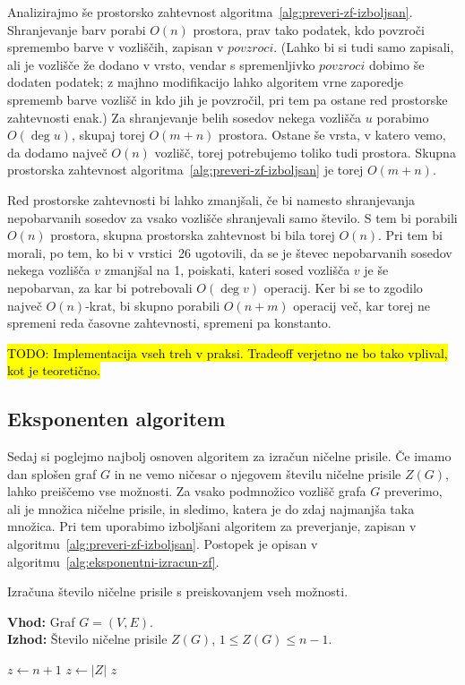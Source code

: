 \documentclass[12pt,a4paper,twoside]{article}
\theoremstyle{definition} %
\theoremstyle{plain} %
\numberwithin{equation}{section}  %
\begin{document}
Analizirajmo še prostorsko zahtevnost algoritma~\ref{alg:preveri-zf-izboljsan}. Shranjevanje barv porabi $O(n)$ prostora, prav tako podatek, kdo povzroči spremembo barve v vozliščih, zapisan v $povzroci$. (Lahko bi si tudi samo zapisali, ali je vozlišče že dodano v vrsto, vendar s spremenljivko $povzroci$ dobimo še dodaten podatek; z majhno modifikacijo lahko algoritem vrne zaporedje sprememb barve vozlišč in kdo jih je povzročil, pri tem pa ostane red prostorske zahtevnosti enak.) Za shranjevanje belih sosedov nekega vozlišča $u$ porabimo $O(\deg u)$, skupaj torej $O(m+n)$ prostora. Ostane še vrsta, v katero vemo, da dodamo največ $O(n)$ vozlišč, torej potrebujemo toliko tudi prostora. Skupna prostorska zahtevnost algoritma~\ref{alg:preveri-zf-izboljsan} je torej $O(m+n)$.

Red prostorske zahtevnosti bi lahko zmanjšali, če bi namesto shranjevanja nepobarvanih sosedov za vsako vozlišče shranjevali samo število. S tem bi porabili $O(n)$ prostora, skupna prostorska zahtevnost bi bila torej $O(n)$. Pri tem bi morali, po tem, ko bi v vrstici~26 ugotovili, da se je števec nepobarvanih sosedov nekega vozlišča $v$ zmanjšal na 1, poiskati, kateri sosed vozlišča $v$ je še nepobarvan, za kar bi potrebovali $O(\deg v)$ operacij. Ker bi se to zgodilo največ $O(n)$-krat, bi skupno porabili $O(n+m)$ operacij več, kar torej ne spremeni reda časovne zahtevnosti, spremeni pa konstanto.

\hl{TODO: Implementacija vseh treh v praksi. Tradeoff verjetno ne bo tako vplival, kot je teoretično.}

\subsection{Eksponenten algoritem}
Sedaj si poglejmo najbolj osnoven algoritem za izračun ničelne prisile. Če imamo dan splošen graf $G$ in ne vemo ničesar o njegovem številu ničelne prisile $Z(G)$, lahko preiščemo vse možnosti. Za vsako podmnožico vozlišč grafa $G$ preverimo, ali je množica ničelne prisile, in sledimo, katera je do zdaj najmanjša taka množica. Pri tem uporabimo izboljšani algoritem za preverjanje, zapisan v algoritmu~\ref{alg:preveri-zf-izboljsan}. Postopek je opisan v algoritmu~\ref{alg:eksponentni-izracun-zf}.
\begin{algorithm}[!h]
    \caption{Izračuna število ničelne prisile s preiskovanjem vseh možnosti.}
    \label{alg:eksponentni-izracun-zf}
    \raggedright
    \textbf{Vhod:} Graf $G = (V,E)$. \\
    \textbf{Izhod:} Število ničelne prisile $Z(G)$, $1 \leq Z(G) \leq n-1$.
    \begin{algorithmic}[1]
        \State $z \gets n+1$
         
        \State $z \gets |Z|$
        \EndIf
        \EndFor
        \State \Return $z$
        \EndFunction
    \end{algorithmic}
\end{algorithm}
\end{document}

